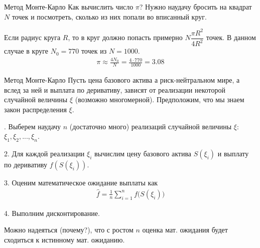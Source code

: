 \documentclass{beamer}
\begin{document}
\begin{frame}{Метод Монте-Карло}
\justify
Как вычислить число $\pi$? Нужно наудачу бросить на квадрат $N$ точек и посмотреть, сколько из них попали во вписанный круг. 

\centering
{}
\justify
Если радиус круга $R$, то в круг должно попасть примерно $N\dfrac{\pi R^2}{4R^2}$ точек. В данном случае в круге $N_0=770$ точек из $N=1000$. 
\begin{align*}
\pi \approx \frac{4N_0}{N} = \frac{4 \cdot 770}{1000} = 3.08
\end{align*}
\end{frame}



\begin{frame}{Метод Монте-Карло}
\justify
Пусть цена базового актива а риск-нейтральном мире, а вслед за ней и выплата по деривативу, зависят от реализации некоторой случайной величины $\xi$ (возможно многомерной). Предположим, что мы знаем закон распределения $\xi$.

. Выберем наудачу $n$ (достаточно много) реализаций случайной величины $\xi$: $\xi_1, \xi_2, ..., \xi_n$.

2. Для каждой реализации $\xi_i$ вычислим цену базового актива $S(\xi_i)$ и выплату по деривативу $f(S(\xi_i))$.

3. Оценим математическое ожидание выплаты как 
\begin{align*}
\hat{f} = \frac{1}{n}\sum\limits_{i=1}^{n}f\Big(S(\xi_i)\Big)
\end{align*}

4. Выполним дисконтирование.

\justify
Можно надеяться (почему?), что с ростом $n$ оценка мат. ожидания будет сходиться к истинному мат. ожиданию.
\end{frame}
\end{document}
